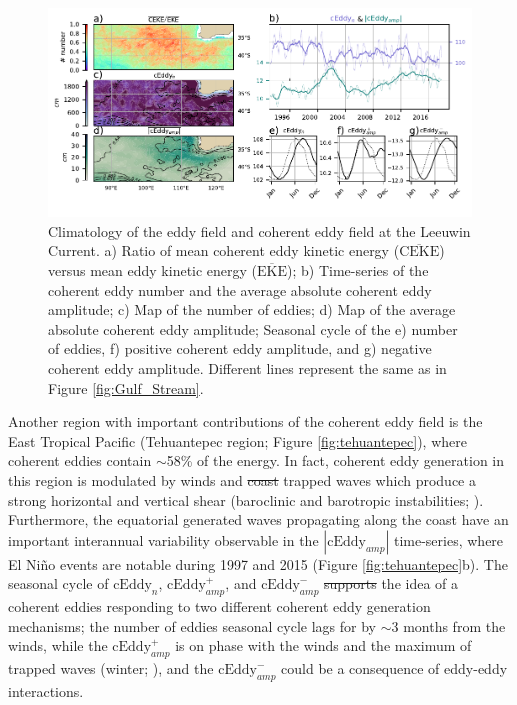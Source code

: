 \documentclass[draft,linenumbers]{agujournal2019}
\newcommand{\MEKE}{\overline{\textrm{EKE}}}
\newcommand{\MCEKE}{\overline{\textrm{CEKE}}}
\newcommand{\cEddy}{\textrm{cEddy}}
\providecommand{\DIFadd}[1]{{\protect\color{blue}\uwave{#1}}} %
\providecommand{\DIFdel}[1]{{\protect\color{red}\sout{#1}}}                      %
\providecommand{\DIFaddbegin}{} %
\providecommand{\DIFaddend}{} %
\providecommand{\DIFdelbegin}{} %
\providecommand{\DIFdelend}{} %
\begin{document}
	\begin{figure}
	    \centering
	    \includegraphics[width=1\textwidth]{figures/regional_ratios_and_stats_V3_0.pdf}
	    \caption{Climatology of the eddy field and coherent eddy field at the Leeuwin Current. a) Ratio of mean coherent eddy kinetic energy ($\MCEKE$) versus mean eddy kinetic energy ($\MEKE$); b) Time-series of the coherent eddy number and the average absolute coherent eddy amplitude; c) Map of the number of eddies; d) Map of the average absolute coherent eddy amplitude; Seasonal cycle of the e) number of eddies, f) positive coherent eddy amplitude, and g) negative coherent eddy amplitude. Different lines represent the same as in Figure \ref{fig:Gulf_Stream}.}
	    \label{fig:leeuwin_cycle}
	\end{figure}


	Another region with important contributions of the coherent eddy field is the East Tropical Pacific (Tehuantepec region; Figure \ref{fig:tehuantepec}), where coherent eddies contain $\sim$58\% of the energy. 
	In fact, coherent eddy generation in this region is modulated by winds and \DIFdelbegin \DIFdel{coast }\DIFdelend \DIFaddbegin \DIFadd{coastlly }\DIFaddend trapped waves which produce a strong horizontal and vertical shear (baroclinic and barotropic instabilities; \citealp{Zamudio_Tehuantepec_2006}). 
	Furthermore, the equatorial generated waves propagating along the coast have an important interannual variability observable in the $|\cEddy_{amp}|$ time-series, where El Niño events are notable during 1997 and 2015 (Figure \ref{fig:tehuantepec}b). 
	The seasonal cycle of $\cEddy_{n}$, $\cEddy_{amp}^+$, and $\cEddy_{amp}^-$ \DIFdelbegin \DIFdel{supports }\DIFdelend \DIFaddbegin \DIFadd{support }\DIFaddend the idea of a coherent eddies responding to two different coherent eddy generation mechanisms; the number of eddies seasonal cycle lags for by $\sim$3 months from the winds, while the $\cEddy_{amp}^+$ is on phase with the winds and the maximum of trapped waves (winter; \citealp{Zamudio_Tehuantepec_2006}), and the $\cEddy_{amp}^-$ could be a consequence of eddy-eddy interactions. 
\end{document}
